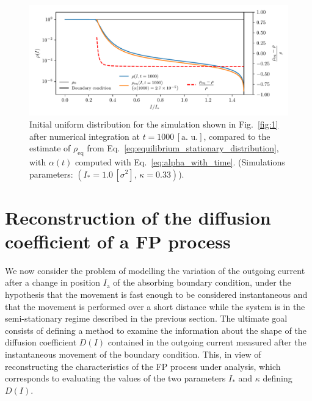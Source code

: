{\begin{figure}[t]
    \centering
    \includegraphics[width=\textwidth]{4_probing_the_diffusive_behavior/figs/final/new_stationary_distribution_s.pdf}
    \caption{Initial uniform distribution for the simulation shown in Fig.~\ref{fig:1} after numerical integration at $t=1000 \, [\text{a. u.}]$, compared to the estimate of $\rho_\mathrm{eq}$ from Eq.~\eqref{eq:equilibrium_stationary_distribution}, with $\alpha(t)$ computed with Eq.~\eqref{eq:alpha_with_time}. (Simulations parameters: $(I_\ast = 1.0\,[\sigma^2],\, \kappa = 0.33)$).}
    \label{fig:3}
\end{figure}


\section{Reconstruction of the diffusion coefficient of a FP process}
\label{sec:moving_the_absorbing_barrier}


We now consider the problem of modelling the variation of the outgoing current after a change in position $I_\mathrm{a}$ of the absorbing boundary condition, under the hypothesis that the movement is fast enough to be considered instantaneous and that the movement is performed over a short distance while the system is in the semi-stationary regime described in the previous section. The ultimate goal consists of defining a method to examine the information about the shape of the diffusion coefficient $D(I)$ contained in the outgoing current measured after the instantaneous movement of the boundary condition. This, in view of reconstructing the characteristics of the FP process under analysis, which corresponds to evaluating the values of the two parameters $I_\ast$ and $\kappa$ defining $D(I)$.

}

